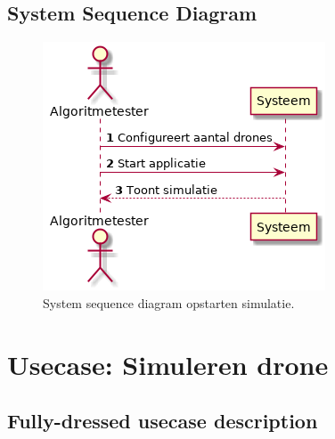 \documentclass[a4paper, 11pt, oneside]{report}
\begin{document}
\label{Usecase:simulatiedronenetwerk:fully-dressed}
\subsection{System Sequence Diagram}
\label{Usecase:simulatiedronenetwerk:systemsequence}
\begin{figure}[H]
	\begin{center}\includegraphics[height=.2\textheight]{UML/out/usecase/sequence/SimulerenDronenetwerk/SimulerenDronenetwerk.png}\end{center}
	\caption{System sequence diagram opstarten simulatie.}
	\label{fig:simulatiedronenetwerk:systemsequence}
\end{figure}


\section[Simuleren drone]{Usecase: Simuleren drone}
\label{Usecase:simulatiedrone}
\subsection{Fully-dressed usecase description}
\end{document}
